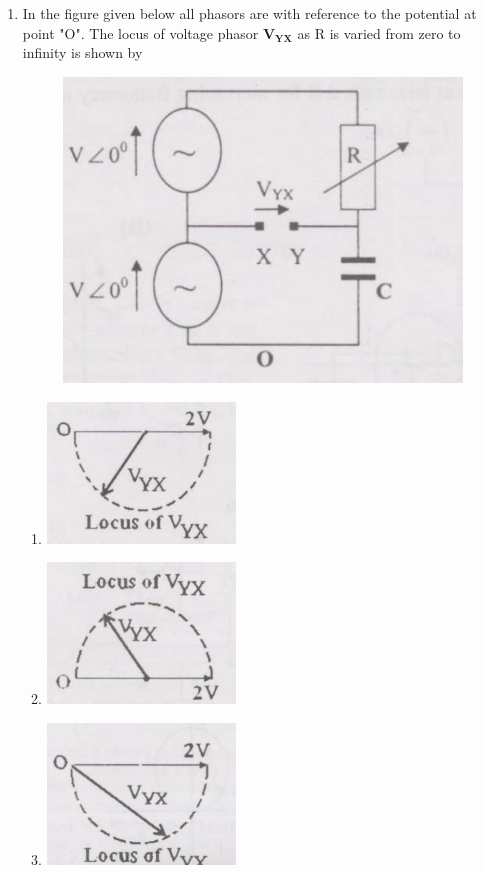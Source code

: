 \documentclass[journal,12pt,onecolumn]{IEEEtran}
\theoremstyle{remark}
\begin{document}
\begin{enumerate}
\item In the figure given below all phasors are with reference to the potential at point "O". The locus of voltage phasor $\mathbf{V_{YX}}$ as R is varied from zero to infinity is shown by
\begin{figure}[h]
	\centering
	\includegraphics[scale=0.5]{figs/fig 12.png}
	\label{Fig-7}
\end{figure}
\begin{enumerate}
\item \includegraphics[width=5cm]{figs/fig 12.1.png}
\item \includegraphics[width=5cm]{figs/fig 12.2.png}
\item \includegraphics[width=5cm]{figs/fig 12.3.png}

\end{enumerate}
\end{enumerate}
\end{document}
